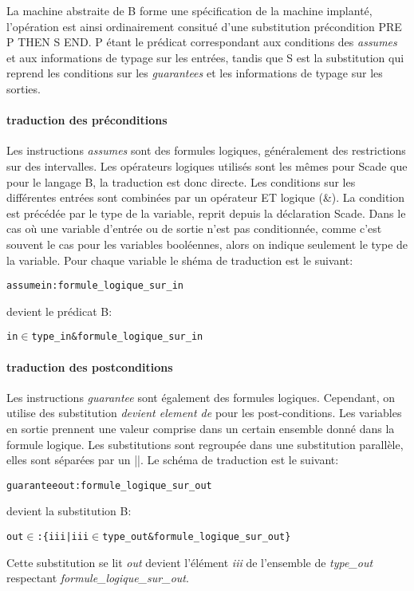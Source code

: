 La machine abstraite de B forme une spécification de la machine implanté,
l'opération est ainsi ordinairement consitué d'une substitution précondition
PRE P THEN S END. P étant le prédicat correspondant aux conditions des
\emph{assumes} et aux informations de typage sur les entrées, tandis que S est
la substitution qui reprend les conditions sur les \emph{guarantees} et les informations de typage
sur les sorties. 

\paragraph{traduction des préconditions}
Les instructions \emph{assumes} sont des formules logiques, généralement des
restrictions sur des intervalles. Les opérateurs logiques utilisés sont les
mêmes pour Scade que pour le langage B, la traduction est donc directe. Les
conditions sur les différentes entrées sont combinées par un opérateur ET
logique (\&). La condition est précédée par le type de la variable, reprit
depuis la déclaration Scade. 
Dans le cas où une variable d'entrée ou de sortie n'est pas conditionnée, comme
c'est souvent le cas pour les variables booléennes, alors on indique seulement
le type de la variable.
Pour chaque variable le shéma de traduction est le suivant:
\begin{alltt}
assume in : formule_logique_sur_in
\end{alltt}
devient le prédicat B:
\begin{alltt}
in \(\in\) type\_in & formule\_logique\_sur\_in
\end{alltt}

\paragraph{traduction des postconditions}
Les instructions \emph{guarantee} sont également des formules
logiques. Cependant, on utilise des substitution \emph{devient element de} pour
les post-conditions. Les variables en sortie prennent une valeur comprise dans
un certain ensemble donné dans la formule logique. Les substitutions sont
regroupée dans une substitution parallèle, elles sont séparées par un ||. Le
schéma de traduction est le suivant:
\begin{alltt}
guarantee out : formule_logique_sur_out
\end{alltt}
devient la substitution B:
\begin{alltt}
out \(\in\): \{ iii | iii \(\in\) type_out & formule_logique_sur_out\}
\end{alltt}
Cette substitution se lit \emph{out} devient l'élément \emph{iii} de l'ensemble
de \emph{type\_out} respectant \emph{formule\_logique\_sur\_out}.


